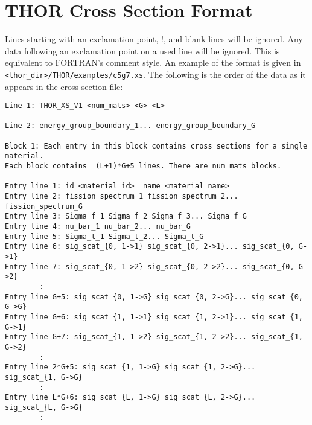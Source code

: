 \section{THOR Cross Section Format}\label{ch:inp:sec:xsfile}

Lines starting with an exclamation point, !, and blank lines will be ignored.
Any data following an exclamation point on a used line will be ignored. This is equivalent to FORTRAN's comment style.
An example of the format is given in \verb"<thor_dir>/THOR/examples/c5g7.xs".
The following is the order of the data as it appears in the cross section file:
\begin{verbatim}
Line 1: THOR_XS_V1 <num_mats> <G> <L>

Line 2: energy_group_boundary_1... energy_group_boundary_G

Block 1: Each entry in this block contains cross sections for a single material.
Each block contains  (L+1)*G+5 lines. There are num_mats blocks.

Entry line 1: id <material_id>  name <material_name>
Entry line 2: fission_spectrum_1 fission_spectrum_2... fission_spectrum_G
Entry line 3: Sigma_f_1 Sigma_f_2 Sigma_f_3... Sigma_f_G
Entry line 4: nu_bar_1 nu_bar_2... nu_bar_G
Entry line 5: Sigma_t_1 Sigma_t_2... Sigma_t_G
Entry line 6: sig_scat_{0, 1->1} sig_scat_{0, 2->1}... sig_scat_{0, G->1}
Entry line 7: sig_scat_{0, 1->2} sig_scat_{0, 2->2}... sig_scat_{0, G->2}
        :
Entry line G+5: sig_scat_{0, 1->G} sig_scat_{0, 2->G}... sig_scat_{0, G->G}
Entry line G+6: sig_scat_{1, 1->1} sig_scat_{1, 2->1}... sig_scat_{1, G->1}
Entry line G+7: sig_scat_{1, 1->2} sig_scat_{1, 2->2}... sig_scat_{1, G->2}
        :
Entry line 2*G+5: sig_scat_{1, 1->G} sig_scat_{1, 2->G}... sig_scat_{1, G->G}
        :
Entry line L*G+6: sig_scat_{L, 1->G} sig_scat_{L, 2->G}... sig_scat_{L, G->G}
        :
\end{verbatim}

